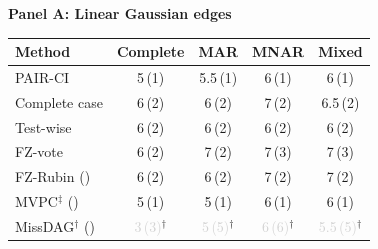 \vspace{0.5em}
\textbf{Panel A: Linear Gaussian edges}\\[0.4em]
\begin{tabular}{lcccc}
    \toprule
    Method & Complete & MAR & MNAR & Mixed \\
    \midrule
    PAIR-CI                                           & 5\,{\scriptsize(1)} & 5.5\,{\scriptsize(1)} & 6\,{\scriptsize(1)} & 6\,{\scriptsize(1)} \\
    Complete case                                     & 6\,{\scriptsize(2)} & 6\,{\scriptsize(2)} & 7\,{\scriptsize(2)} & 6.5\,{\scriptsize(2)} \\
    Test-wise                                         & 6\,{\scriptsize(2)} & 6\,{\scriptsize(2)} & 6\,{\scriptsize(2)} & 6\,{\scriptsize(2)} \\
    FZ-vote                                           & 6\,{\scriptsize(2)} & 7\,{\scriptsize(2)} & 7\,{\scriptsize(3)} & 7\,{\scriptsize(3)} \\
    FZ-Rubin (\citeauthor{witte2022multiple})         & 6\,{\scriptsize(2)} & 6\,{\scriptsize(2)} & 7\,{\scriptsize(2)} & 7\,{\scriptsize(2)} \\
    MVPC$^\ddagger$ (\citeauthor{tu2019causal})       & 5\,{\scriptsize(1)} & 5\,{\scriptsize(1)} & 6\,{\scriptsize(1)} & 6\,{\scriptsize(1)} \\
    MissDAG$^\dagger$ (\citeauthor{gao2022missdag})   & \textcolor{lightgray}{3\,{\scriptsize(3)}}$^\dagger$ & \textcolor{lightgray}{5\,{\scriptsize(5)}}$^\dagger$ & \textcolor{lightgray}{6\,{\scriptsize(6)}}$^\dagger$ & \textcolor{lightgray}{5.5\,{\scriptsize(5)}}$^\dagger$ \\
    \bottomrule
\end{tabular}

